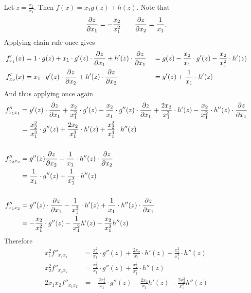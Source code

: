 \documentclass{eeleyes}
\begin{document}
Let $z = \frac{x_2}{x_1}$. Then $f(x) = x_1 g(z) + h(z)$. Note that
\[
    \pdv{z}{x_1}  = -\frac{x_2}{x_1^2} \qquad \pdv{z}{x_2} = \frac{1}{x_1}
.\]
Applying chain rule once gives
\begin{alignat*}{3}
    f'_{x_1}(x) &= 1 \cdot g(z) + x_1 \cdot g'(z) \cdot \pdv{z}{x_1} + h'(z) \cdot \pdv{z}{x_1} &&= g(z) - \frac{x_2}{x_1} \cdot g'(z) - \frac{x_2}{x_1^2} \cdot h'(z) \\
    f'_{x_2}(x) &= x_1 \cdot g'(z) \cdot \pdv{z}{x_2} + h'(z) \cdot \pdv{z}{x_2} &&= g'(z) + \frac{1}{x_1} \cdot h'(z)
\end{alignat*}
And thus applying once again
{\allowdisplaybreaks
\begin{align*}
    f''_{x_1 x_1} &= g'(z) \cdot \pdv{z}{x_1} + \frac{x_2}{x_1^2} \cdot g'(z) - \frac{x_2}{x_1} \cdot g''(z) \cdot \pdv{z}{x_1} + \frac{2x_2}{x_1^3} \cdot h'(z) - \frac{x_2}{x_1^2} \cdot h''(z) \cdot \pdv{z}{x_1} \\
                  &= \frac{x_2^2}{x_1^3} \cdot g''(z) + \frac{2x_2}{x_1^3} \cdot h'(z) + \frac{x_2^2}{x_1^4} \cdot h''(z) \\
\\
    f''_{x_2 x_2} &= g''(z) \pdv{z}{x_2} + \frac{1}{x_1} \cdot h''(z) \cdot \pdv{z}{x_2} \\
                  &= \frac{1}{x_1} \cdot g''(z) + \frac{1}{x_1^2} \cdot h''(z) \\
\\
    f''_{x_1 x_2} &= g''(z) \cdot \pdv{z}{x_1} - \frac{1}{x_1^2} \cdot h'(z) + \frac{1}{x_1} \cdot h''(z) \cdot \pdv{z}{x_1} \\
                  &= - \frac{x_2}{x_1^2} \cdot g''(z) - \frac{1}{x_1^2} h'(z) - \frac{x_2}{x_1^3} h''(z)
\end{align*}}
Therefore
\begin{align*}
    x_1^2 f''_{x_1 x_1}    &= \frac{x_2^2}{x_1} \cdot g''(z) + \frac{2x_2}{x_1} \cdot h'(z) + \frac{x_2^2}{x_1^2} \cdot h''(z) \\
    x_2^2 f''_{x_2 x_2}    &= \frac{x_2^2}{x_1} \cdot g''(z) + \frac{x_2^2}{x_1^2} \cdot h''(z) \\
    2x_1 x_2 f''_{x_1 x_2} &= - \frac{2x_2^2}{x_1} \cdot g''(z) - \frac{2x_2}{x_1} h'(z) - \frac{2x_2^2}{x_1^2} h''(z)
\end{align*}
\end{document}
